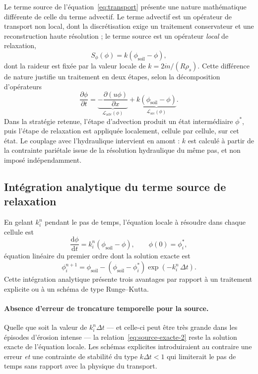 \documentclass[11pt,a4paper]{report}
\newcommand{\phisol}{\phi_{\mathrm{soil}}}
\newcommand{\mdot}{\dot{m}}
\newcommand{\dt}{\Delta t}
\begin{document}
Le terme source de l'équation~\eqref{eq:transport} présente une nature mathématique différente de celle du
terme advectif. Le terme advectif est un opérateur de transport non local, dont la discrétisation exige un
traitement conservateur et une reconstruction haute résolution ; le terme source est un opérateur
\emph{local} de relaxation,
\begin{equation}
S_\phi(\phi) = k\left(\phisol - \phi\right),
\label{eq:opsrc}
\end{equation}
dont la raideur est fixée par la valeur locale de \(k = 2\mdot/(R\rho_s)\). Cette différence de nature
justifie un traitement en deux étapes, selon la décomposition d'opérateurs
\begin{equation}
\frac{\partial\phi}{\partial t} =
\underbrace{-\frac{\partial(u\phi)}{\partial x}}_{\mathcal{L}_{\mathrm{adv}}(\phi)}
+ \underbrace{k\left(\phisol-\phi\right)}_{\mathcal{L}_{\mathrm{src}}(\phi)} .
\label{eq:splitting}
\end{equation}
Dans la stratégie retenue, l'étape d'advection produit un état intermédiaire \(\phi^*\), puis l'étape de
relaxation est appliquée localement, cellule par cellule, sur cet état. Le couplage avec l'hydraulique
intervient en amont : \(k\) est calculé à partir de la contrainte pariétale issue de la résolution
hydraulique du même pas, et non imposé indépendamment.

\subsection{Intégration analytique du terme source de relaxation}

En gelant \(k_i^n\) pendant le pas de temps, l'équation locale à résoudre dans chaque cellule est
\begin{equation}
\frac{\mathrm{d}\phi}{\mathrm{d}t} = k_i^n\left(\phisol - \phi\right),
\qquad \phi(0) = \phi_i^*,
\label{eq:relax-locale}
\end{equation}
équation linéaire du premier ordre dont la solution exacte est
\begin{equation}
\phi_i^{n+1} = \phisol - \left(\phisol - \phi_i^*\right)\exp\left(-k_i^n\,\dt\right).
\label{eq:source-exacte-2}
\end{equation}
Cette intégration analytique présente trois avantages par rapport à un traitement explicite ou à un
schéma de type Runge--Kutta.

\paragraph{Absence d'erreur de troncature temporelle pour la source.} Quelle que soit la valeur de
\(k_i^n\dt\) — et celle-ci peut être très grande dans les épisodes d'érosion intense — la
relation~\eqref{eq:source-exacte-2} reste la solution exacte de l'équation locale. Les schémas explicites
introduiraient au contraire une erreur \emph{et} une contrainte de stabilité du type \(k\dt<1\) qui
limiterait le pas de temps sans rapport avec la physique du transport.
\end{document}
